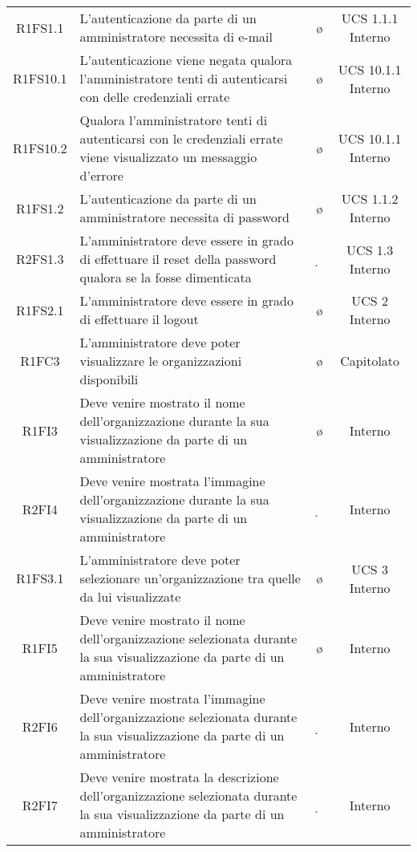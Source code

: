 {\begin{longtable}{ c C{4cm} c c}
R1FS1.1 & L’autenticazione da parte di un amministratore necessita di e-mail & \o & UCS 1.1.1 Interno\\

R1FS10.1 & L’autenticazione viene negata qualora l'amministratore tenti di autenticarsi con delle credenziali errate & \o & UCS 10.1.1 Interno \\

R1FS10.2 & Qualora l'amministratore tenti di autenticarsi con le credenziali errate viene visualizzato un messaggio d’errore & \o & UCS 10.1.1 Interno \\

R1FS1.2 & L’autenticazione da parte di un amministratore necessita di password & \o & UCS 1.1.2 Interno\\

R2FS1.3 & L'amministratore deve essere in grado di effettuare il reset della password qualora se la fosse dimenticata & \d & UCS 1.3 Interno\\

R1FS2.1 & L'amministratore deve essere in grado di effettuare il logout & \o & UCS 2 Interno\\

R1FC3 & L'amministratore deve poter visualizzare le organizzazioni disponibili & \o & Capitolato\\

R1FI3 & Deve venire mostrato il nome dell'organizzazione durante la sua visualizzazione da parte di un amministratore & \o & Interno\\

R2FI4 & Deve venire mostrata l'immagine dell'organizzazione durante la sua visualizzazione da parte di un amministratore & \d & Interno\\

R1FS3.1 & L'amministratore deve poter selezionare un'organizzazione tra quelle da lui visualizzate & \o & UCS 3 Interno\\

R1FI5 & Deve venire mostrato il nome dell'organizzazione selezionata durante la sua visualizzazione da parte di un amministratore & \o & Interno\\

R2FI6 & Deve venire mostrata l'immagine dell'organizzazione selezionata durante la sua visualizzazione da parte di un amministratore & \d & Interno\\

R2FI7 & Deve venire mostrata la descrizione dell'organizzazione selezionata durante la sua visualizzazione da parte di un amministratore & \d & Interno\\


\end{longtable}}

